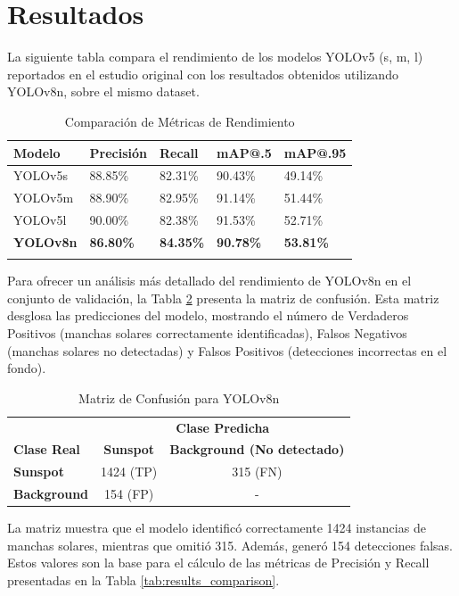 \documentclass[journal]{IEEEtran}
\begin{document}
\section{Resultados}
La siguiente tabla compara el rendimiento de los modelos YOLOv5 (s, m, l) reportados en el estudio original con los resultados obtenidos utilizando YOLOv8n, sobre el mismo dataset.

\begin{table}[htbp]
\centering
\caption{Comparación de Métricas de Rendimiento}
\label{tab:results_comparison}
\begin{tabular}{@{}lllll@{}}
\toprule
\textbf{Modelo} & \textbf{Precisión} & \textbf{Recall} & \textbf{mAP@.5} & \textbf{mAP@.95} \\
\midrule
YOLOv5s & 88.85\% & 82.31\% & 90.43\% & 49.14\% \\
YOLOv5m & 88.90\% & 82.95\% & 91.14\% & 51.44\% \\
YOLOv5l & 90.00\% & 82.38\% & 91.53\% & 52.71\% \\
\textbf{YOLOv8n} & \textbf{86.80\%} & \textbf{84.35\%} & \textbf{90.78\%} & \textbf{53.81\%} \\
\bottomrule
\label{tab:comparison_results}
\end{tabular}
\end{table}

Para ofrecer un análisis más detallado del rendimiento de YOLOv8n en el conjunto de validación, la Tabla \ref{tab:confusion_matrix} presenta la matriz de confusión. Esta matriz desglosa las predicciones del modelo, mostrando el número de Verdaderos Positivos (manchas solares correctamente identificadas), Falsos Negativos (manchas solares no detectadas) y Falsos Positivos (detecciones incorrectas en el fondo).

\begin{table}[htbp]
\centering
\caption{Matriz de Confusión para YOLOv8n}
\label{tab:confusion_matrix}
\begin{tabular}{@{}l|cc@{}}
\toprule
\textbf{} & \multicolumn{2}{c}{\textbf{Clase Predicha}} \\
\textbf{Clase Real} & \textbf{Sunspot} & \textbf{Background (No detectado)} \\
\midrule
\textbf{Sunspot} & 1424 (TP) & 315 (FN) \\
\textbf{Background} & 154 (FP) & - \\
\bottomrule
\end{tabular}
\end{table}

La matriz muestra que el modelo identificó correctamente 1424 instancias de manchas solares, mientras que omitió 315. Además, generó 154 detecciones falsas. Estos valores son la base para el cálculo de las métricas de Precisión y Recall presentadas en la Tabla \ref{tab:results_comparison}.
\end{document}
